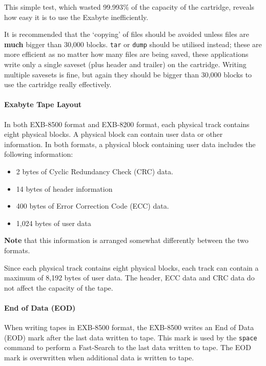 This simple test, which wasted 99.993\% of the capacity of the cartridge,
reveals how easy it is to use the Exabyte inefficiently.

It is recommended that the `copying' of files should be avoided unless
files are {\bf much} bigger than 30,000 blocks. {\tt tar} or {\tt dump}
should be utilised instead; these are more efficient as no matter how many
files are being saved, these applications write only a single saveset (plus
header and trailer) on the cartridge. Writing multiple savesets is fine, but
again they should be bigger than 30,000 blocks to use the cartridge really
effectively.

\paragraph {Exabyte Tape Layout}

In both EXB-8500 format and EXB-8200 format, each physical track contains
eight physical blocks. A physical block can contain user data or other
information. In both formats, a physical block containing user data includes
the following information:

\begin {itemize}

\item 2 bytes of Cyclic Redundancy Check (CRC) data.

\item 14 bytes of header information

\item 400 bytes of Error Correction Code (ECC) data.

\item 1,024 bytes of user data

\end {itemize}

{\bf Note} that this information is arranged somewhat differently between
the two formats.

Since each physical track contains eight physical blocks, each track can
contain a maximum of 8,192 bytes of user data. The header, ECC data and CRC
data do not affect the capacity of the tape.

\paragraph {End of Data (EOD)}

When writing tapes in EXB-8500 format, the EXB-8500 writes an End of Data
(EOD) mark after the last data written to tape. This mark is used by the
{\tt space} command to perform a Fast-Search to the last data written to tape.
The EOD mark is overwritten when additional data is written to tape.


